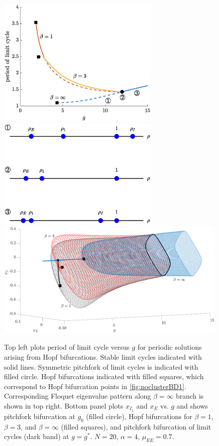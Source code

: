 \documentclass[reqno]{siamonline190516}
\begin{document}
\begin{figure}
    \centering
    \includegraphics[width=7.8cm]{images/periodvsg}
    \includegraphics[width=7.8cm]{images/floquet1.eps}
    \includegraphics[width=16cm]{images/pitchbif.eps}
    \caption{Top left plots period of limit cycle versus $g$ for periodic solutions arising from Hopf bifurcations. Stable limit cycles indicated with solid lines. Symmetric pitchfork of limit cycles is indicated with filled circle. Hopf bifurcations indicated with filled squares, which correspond to Hopf bifurcation points in \cref{fig:noclusterBD1}. Corresponding Floquet eigenvalue pattern along $\beta = \infty$ branch is shown in top right. Bottom panel plots $x_{I_1}$ and $x_E$ vs. $g$ and shows pitchfork bifurcation at $g_0$ (filled circle), Hopf bifurcations for $\beta = 1$, $\beta = 3$, and $\beta = \infty$ (filled squares), and pitchfork bifurcation of limit cycles (dark band) at $g = g^*$. $N = 20$,  $\alpha = 4$, $\mu_{EE} = 0.7$.}
    \label{fig:periodvsg}
\end{figure}
\end{document}
